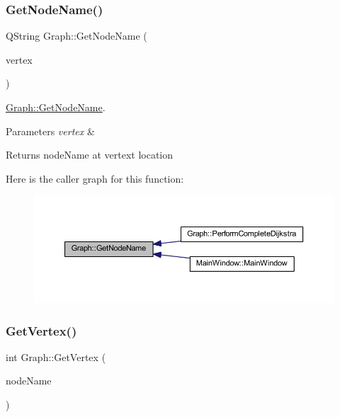 \subsubsection{\texorpdfstring{Get\+Node\+Name()}{GetNodeName()}}
{\footnotesize\ttfamily Q\+String Graph\+::\+Get\+Node\+Name (\begin{DoxyParamCaption}\item[{int}]{vertex }\end{DoxyParamCaption})}



\mbox{\hyperlink{class_graph_a3102766a44bdc521d67dc1ac57c948b4}{Graph\+::\+Get\+Node\+Name}}. 


\begin{DoxyParams}{Parameters}
{\em vertex} & \\
\hline
\end{DoxyParams}
\begin{DoxyReturn}{Returns}
node\+Name at vertext location 
\end{DoxyReturn}
Here is the caller graph for this function\+:
\nopagebreak
\begin{figure}[H]
\begin{center}
\leavevmode
\includegraphics[width=350pt]{class_graph_a3102766a44bdc521d67dc1ac57c948b4_icgraph}
\end{center}
\end{figure}
\mbox{\label{class_graph_a7f7b9f3d4992166ce4b52a1ea7d9c816}} 
\subsubsection{\texorpdfstring{Get\+Vertex()}{GetVertex()}}
{\footnotesize\ttfamily int Graph\+::\+Get\+Vertex (\begin{DoxyParamCaption}\item[{Q\+String}]{node\+Name }\end{DoxyParamCaption})}




